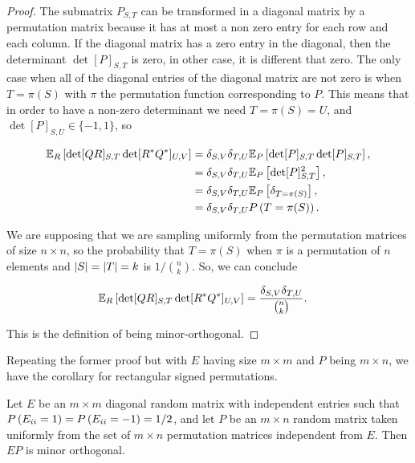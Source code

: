 \begin{proof}
    The submatrix $P_{S,T}$ can be transformed in a diagonal matrix by a permutation matrix because it has at most a non zero entry for each row and each column. If the diagonal matrix has a zero entry in the diagonal, then the determinant $\det[P]_{S,T}$ is zero, in other case, it is different that zero. The only case when all of the diagonal entries of the diagonal matrix are not zero is when $T = \pi(S)$ with $\pi$ the permutation function corresponding to $P$. This means that in order to have a non-zero determinant we need $T = \pi(S) = U$, and $\det[P]_{S,U} \in \{-1,1\}$, so

    \begin{align*}
        \mathbb E_R \left[ \det[QR]_{S,T}\det[\hermit{R}\hermit{Q}]_{U,V} \right] &= \delta_{S,V} \delta_{T,U} \mathbb E_{P}\left[ \det [P]_{S,T}\det[P]_{S,T} \right],\\ 
        &= \delta_{S,V} \delta_{T,U} \mathbb E_{P}\left[ \det [P]_{S,T}^2 \right],\\ 
        &= \delta_{S,V} \delta_{T,U} \mathbb E_{P}\left[  \delta_{T=\pi(S)} \right], \\ 
        &= \delta_{S,V} \delta_{T,U} \P{T = \pi(S)}.
    \end{align*}

    We are supposing that we are sampling uniformly from the permutation matrices of size $n \times n$, so the probability that $T = \pi(S)$ when $\pi$ is a permutation of $n$ elements and $\abs{S} = \abs{T} = k$ is $1/\binom{n}{k}$. So, we can conclude

    \begin{align*}
        \mathbb E_R \left[ \det[QR]_{S,T}\det[\hermit{R}\hermit{Q}]_{U,V} \right] &= \frac{\delta_{S,V} \delta_{T,U}}{\binom{n}{k}}.
    \end{align*}

    This is the definition of being minor-orthogonal. %
\end{proof}

Repeating the former proof but with $E$ having size $m\times m$ and $P$ being $m\times n$, we have the corollary for rectangular signed permutations.

\begin{corollary}
    Let $E$ be an $m\times m$ diagonal random matrix with independent entries such that $\P{E_{ii} = 1} = \P{E_{ii} = -1} = 1/2$, and let $P$ be an $m\times n$ random matrix taken uniformly from the set of $m\times n$ permutation matrices independent from $E$. Then $EP$ is minor orthogonal.
\end{corollary}

